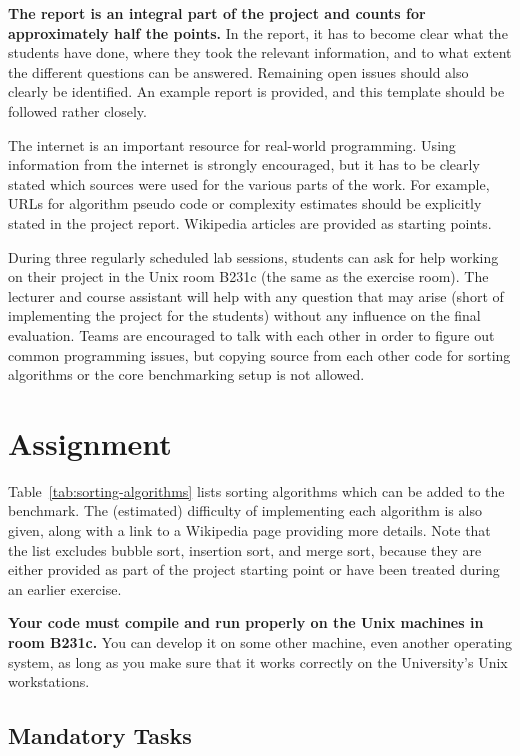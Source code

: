 \documentclass[a4paper,10pt]{article}
\begin{document}
\textbf{The report is an integral part of the project and counts for approximately half the points.}
In the report, it has to become clear what the students have done, where they took the relevant information, and to what extent the different questions can be answered.
Remaining open issues should also clearly be identified.
An example report is provided, and this template should be followed rather closely.

The internet is an important resource for real-world programming.
Using information from the internet is strongly encouraged, but it has to be clearly stated which sources were used for the various parts of the work.
For example, URLs for algorithm pseudo code or complexity estimates should be explicitly stated in the project report.
Wikipedia articles are provided as starting points.

During three regularly scheduled lab sessions, students can ask for help working on their project in the Unix room B231c (the same as the exercise room).
The lecturer and course assistant will help with any question that may arise (short of implementing the project for the students) without any influence on the final evaluation.
Teams are encouraged to talk with each other in order to figure out common programming issues, but copying source from each other code for sorting algorithms or the core benchmarking setup is not allowed.

\section*{Assignment}

Table~\ref{tab:sorting-algorithms} lists sorting algorithms which can be added to the benchmark.
The (estimated) difficulty of implementing each algorithm is also given, along with a link to a Wikipedia page providing more details.
Note that the list excludes bubble sort, insertion sort, and merge sort, because they are either provided as part of the project starting point or have been treated during an earlier exercise.

\textbf{Your code must compile and run properly on the Unix machines in room B231c.}
You can develop it on some other machine, even another operating system, as long as you make sure that it works correctly on the University's Unix workstations.



\subsection*{Mandatory Tasks}
\end{document}
